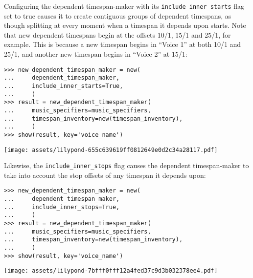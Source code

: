 Configuring the dependent timespan-maker with its
\texttt{include\_inner\_starts} flag set to true causes it to create contiguous
groups of dependent timespans, as though splitting at every moment when a
timespan it depends upon starts. Note that new dependent timespans begin at the
offsets 10/1, 15/1 and 25/1, for example. This is because a new timespan begins
in \enquote{Voice 1} at both 10/1 and 25/1, and another new timespan begins in
\enquote{Voice 2} at 15/1:

\begin{comment}
<abjad>
new_dependent_timespan_maker = new(
    dependent_timespan_maker,
    include_inner_starts=True,
    )
result = new_dependent_timespan_maker(
    music_specifiers=music_specifiers,
    timespan_inventory=new(timespan_inventory),
    )
show(result, key='voice_name')
</abjad>
\end{comment}

\begin{singlespacing}
\vspace{-0.5\baselineskip}
\begin{lstlisting}
>>> new_dependent_timespan_maker = new(
...     dependent_timespan_maker,
...     include_inner_starts=True,
...     )
>>> result = new_dependent_timespan_maker(
...     music_specifiers=music_specifiers,
...     timespan_inventory=new(timespan_inventory),
...     )
>>> show(result, key='voice_name')
\end{lstlisting}
\noindent\texttt{[image: assets/lilypond-655c639619ff0812649e0d2c34a28117.pdf]}
\end{singlespacing}

\noindent Likewise, the \texttt{include\_inner\_stops} flag causes the
dependent timespan-maker to take into account the stop offsets of any timespan
it depends upon:

\begin{comment}
<abjad>
new_dependent_timespan_maker = new(
    dependent_timespan_maker,
    include_inner_stops=True,
    )
result = new_dependent_timespan_maker(
    music_specifiers=music_specifiers,
    timespan_inventory=new(timespan_inventory),
    )
show(result, key='voice_name')
</abjad>
\end{comment}

\begin{singlespacing}
\vspace{-0.5\baselineskip}
\begin{lstlisting}
>>> new_dependent_timespan_maker = new(
...     dependent_timespan_maker,
...     include_inner_stops=True,
...     )
>>> result = new_dependent_timespan_maker(
...     music_specifiers=music_specifiers,
...     timespan_inventory=new(timespan_inventory),
...     )
>>> show(result, key='voice_name')
\end{lstlisting}
\noindent\texttt{[image: assets/lilypond-7bfff0fff12a4fed37c9d3b032378ee4.pdf]}
\end{singlespacing}

